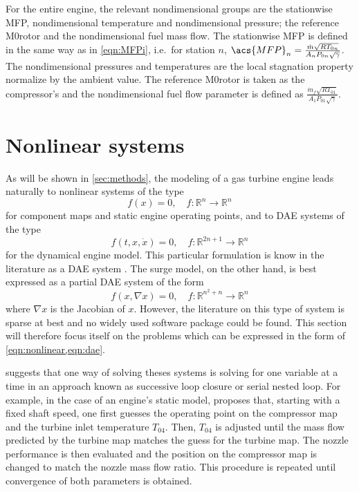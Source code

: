 For the entire engine, the relevant nondimensional groups are the stationwise
\acl{MFP}, nondimensional temperature and nondimensional pressure;
the reference \acl{M0rotor} and the nondimensional fuel mass flow. 
The stationwise \acl{MFP} is defined in the same way as in \cref{eqn:MFPi}, 
i.e.\ for station $n$, $\acs{MFP}_n = \MFP{n}$. 
The nondimensional pressures and temperatures are the local stagnation property normalize by the ambient value. The reference \acl{M0rotor} is taken as the compressor's 
and the nondimensional fuel flow parameter is defined as 
$\frac{\dot{m}_f \sqrt{RT_{01}}}{A_1 P_{01} \sqrt{\gamma}}$.

\section{Nonlinear systems}
\label{sec:review:numeric}

As will be shown in \cref{sec:methods}, the modeling of a gas turbine engine leads naturally to nonlinear systems of the type 
\begin{equation}
    \label{eqn:nonlinear}
    f(x) = 0, \quad f:\mathbb{R}^n \rightarrow \mathbb{R}^n
\end{equation}
for component maps and static engine operating points, and to \acl{DAE} systems of the type
\begin{equation}
    \label{eqn:dae}
    f(t, x, \dot{x}) = 0, \quad f:\mathbb{R}^{2n+1} \rightarrow \mathbb{R}^n
\end{equation}
for the dynamical engine model. 
This particular formulation is know in the literature as a \ac{DAE} system \cite{Brenan1995}.
The surge model, on the other hand, is best expressed as a partial \acl{DAE} system of the form
\begin{equation}
    f(x, \nabla x) = 0, \quad f:\mathbb{R}^{n^2+n} \rightarrow \mathbb{R}^n
\end{equation}
where $\nabla x$ is the Jacobian of $x$. 
However, the literature on this type of system is sparse at best and no widely used software package could be found.
This section will therefore focus itself on the problems which can be expressed in the form of \cref{eqn:nonlinear,eqn:dae}.

\textcite{walsh2004gas} suggests that one way of solving theses systems is solving for one variable at a time in an approach known as successive loop closure or serial nested loop. 
For example, in the case of an engine's static model, \textcite{walsh2004gas} proposes that, starting with a fixed shaft speed, one first guesses the operating point on the compressor map and the turbine inlet temperature $T_{04}$. Then, $T_04$ is adjusted until the mass flow predicted by the turbine map matches the guess for the turbine map. The nozzle performance is then evaluated and the position on the compressor map is changed to match the nozzle mass flow ratio. This procedure is repeated until convergence of both parameters is obtained.

